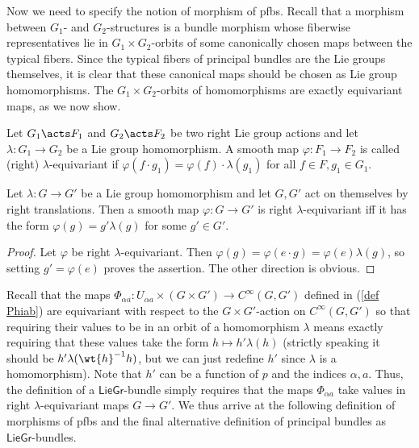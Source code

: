 Now we need to specify the notion of morphism of \glspl{pfb}. Recall that a morphism between $G_1$- and $G_2$-structures is a bundle morphism whose fiberwise representatives lie in $G_1\times G_2$-orbits of some canonically chosen maps between the typical fibers. Since the typical fibers of principal bundles are the Lie groups themselves, it is clear that these canonical maps should be chosen as Lie group homomorphisms. The $G_1\times G_2$-orbits of homomorphisms are exactly equivariant maps, as we now show. 

\begin{defn}
    Let $G_1\acts F_1$ and $G_2\acts F_2$ be two right Lie group actions and let $\lambda:G_1\to G_2$ be a Lie group homomorphism. A smooth map $\varphi:F_1\to F_2$ is called (right) $\lambda$-equivariant if $\varphi(f\cdot g_1)=\varphi(f)\cdot \lambda(g_1)$ for all $f\in F,g_1\in G_1$.
\end{defn}

\begin{prop}
    Let $\lambda:G\to G'$ be a Lie group homomorphism and let $G,G'$ act on themselves by right translations. Then a smooth map $\varphi:G\to G'$ is right $\lambda$-equivariant iff it has the form $\varphi(g)=g'\lambda(g)$ for some $g'\in G'$.
\end{prop}
\begin{proof}
    Let $\varphi$ be right $\lambda$-equivariant. Then
    $\varphi(g)=\varphi(e\cdot g)=\varphi(e)\lambda(g)$,
    so setting $g'=\varphi(e)$ proves the assertion. The other direction is obvious.
\end{proof}


Recall that the maps $\Phi_{\alpha a}:U_{\alpha a}\times (G\times G')\to C^\infty(G,G')$ defined in (\ref{def Phiab}) are equivariant with respect to the $G\times G'$-action on $C^\infty(G,G')$ so that requiring their values to be in an orbit of a homomorphism $\lambda$ means exactly requiring that these values take the form $h\mapsto h'\lambda (h)$ (strictly speaking it should be $h'\lambda(\wt{h}^{-1}h)$, but we can just redefine $h'$ since $\lambda$ is a homomorphism). Note that $h'$ can be a function of $p$ and the indices $\alpha,a$. Thus, the definition of a $\mathsf{LieGr}$-bundle simply requires that the maps $\Phi_{\alpha a}$ take values in right $\lambda$-equivariant maps $G\to G'$. We thus arrive at the following definition of morphisms of \glspl{pfb} and the final alternative definition of principal bundles as $\mathsf{LieGr}$-bundles.

